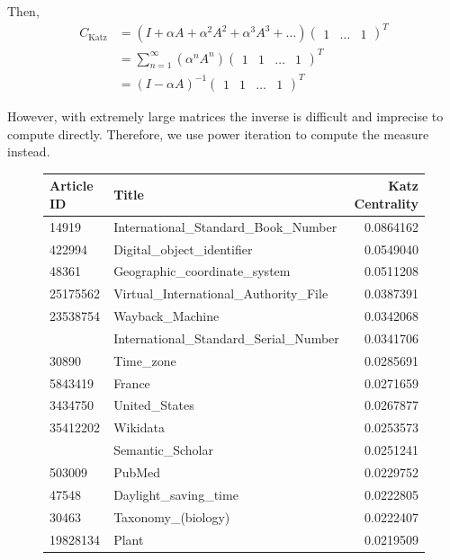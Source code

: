 \documentclass{article}
\begin{document}
Then,
\begin{align*}
    C_{\textrm{Katz}} &= (I + \alpha A + \alpha^2 A^2 + \alpha^3 A^3 + \dots) \begin{pmatrix}
        1 & \dots & 1
    \end{pmatrix}^T \\
    &= \sum^\infty_{n=1} (\alpha^n A^n)\begin{pmatrix}
    1 & 1 & \dots & 1
\end{pmatrix}^T \\ 
&= (I - \alpha A)^{-1} \begin{pmatrix}
    1 & 1 & \dots & 1
\end{pmatrix}^T 
\end{align*}

However, with extremely large matrices the inverse is difficult and imprecise to compute directly.
Therefore, we use power iteration to compute the measure instead.

\begin{figure}[H]
    \centering
    \begin{tabular}{llr}
        \toprule
        Article ID & Title & Katz Centrality\\
        \midrule
        14919 & International\_Standard\_Book\_Number & 0.0864162\\
        422994 & Digital\_object\_identifier & 0.0549040\\
        48361 & Geographic\_coordinate\_system & 0.0511208\\
        25175562 & Virtual\_International\_Authority\_File & 0.0387391\\
    23538754 & Wayback\_Machine & 0.0342068\\
    \addlinespace
    234930 & International\_Standard\_Serial\_Number & 0.0341706\\
    30890 & Time\_zone & 0.0285691\\
    5843419 & France & 0.0271659\\
    3434750 & United\_States & 0.0267877\\
    35412202 & Wikidata & 0.0253573\\
    \addlinespace
    48455863 & Semantic\_Scholar & 0.0251241\\
    503009 & PubMed & 0.0229752\\
    47548 & Daylight\_saving\_time & 0.0222805\\
    30463 & Taxonomy\_(biology) & 0.0222407\\
    19828134 & Plant & 0.0219509\\
    \bottomrule
    \end{tabular}
\end{figure}
\end{document}
